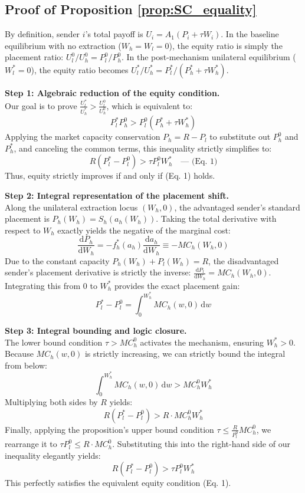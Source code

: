 \documentclass[12pt, a4paper]{article}
\begin{document}
\subsection{Proof of Proposition \ref{prop:SC_equality}}
By definition, sender $i$'s total payoff is $U_i = A_1(P_i + \tau W_i)$. 
In the baseline equilibrium with no extraction ($W_h=W_l=0$), the equity ratio is simply the placement ratio: $U_l^0/U_h^0 = P_l^0/P_h^0$. 
In the post-mechanism unilateral equilibrium ($W_l^*=0$), the equity ratio becomes $U_l^*/U_h^* = P_l^*/(P_h^* + \tau W_h^*)$.

\textbf{Step 1: Algebraic reduction of the equity condition.} \\
Our goal is to prove $\frac{U_l^*}{U_h^*} > \frac{U_l^0}{U_h^0}$, which is equivalent to:
\[
P_l^* P_h^0 > P_l^0 (P_h^* + \tau W_h^*)
\]
Applying the market capacity conservation $P_h = R - P_l$ to substitute out $P_h^0$ and $P_h^*$, and canceling the common terms, this inequality strictly simplifies to:
\[
R(P_l^* - P_l^0) > \tau P_l^0 W_h^* \quad \text{--- (Eq. 1)}
\]
Thus, equity strictly improves if and only if (Eq. 1) holds.

\textbf{Step 2: Integral representation of the placement shift.} \\
Along the unilateral extraction locus $(W_h, 0)$, the advantaged sender's standard placement is $P_h(W_h) = S_h(a_h(W_h))$. Taking the total derivative with respect to $W_h$ exactly yields the negative of the marginal cost:
\[
\frac{\mathrm{d}P_h}{\mathrm{d}W_h} = -f_h^*(a_h) \frac{\mathrm{d}a_h}{\mathrm{d}W_h} \equiv -MC_h(W_h, 0)
\]
Due to the constant capacity $P_h(W_h) + P_l(W_h) = R$, the disadvantaged sender's placement derivative is strictly the inverse: $\frac{\mathrm{d}P_l}{\mathrm{d}W_h} = MC_h(W_h, 0)$. 
Integrating this from $0$ to $W_h^*$ provides the exact placement gain:
\[
P_l^* - P_l^0 = \int_0^{W_h^*} MC_h(w, 0) \, \mathrm{d}w
\]

\textbf{Step 3: Integral bounding and logic closure.} \\
The lower bound condition $\tau > MC_h^0$ activates the mechanism, ensuring $W_h^* > 0$. 
Because $MC_h(w, 0)$ is strictly increasing, we can strictly bound the integral from below:
\[
\int_0^{W_h^*} MC_h(w, 0) \, \mathrm{d}w > MC_h^0 W_h^*
\]
Multiplying both sides by $R$ yields:
\[
R(P_l^* - P_l^0) > R \cdot MC_h^0 W_h^*
\]
Finally, applying the proposition's upper bound condition $\tau \le \frac{R}{P_l^0} MC_h^0$, we rearrange it to $\tau P_l^0 \le R \cdot MC_h^0$. Substituting this into the right-hand side of our inequality elegantly yields:
\[
R(P_l^* - P_l^0) > \tau P_l^0 W_h^*
\]
This perfectly satisfies the equivalent equity condition (Eq. 1). 
\end{document}
